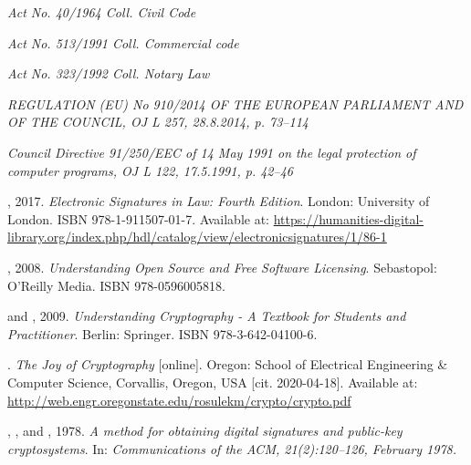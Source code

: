 \documentclass[thesismargins, english, thesislinespacing, onelinechapterstyle, upjsfrontpage]{rnthesis}
\begin{document}
\begin{thebibliography}{9}

  \emph{Act No. 40/1964 Coll. Civil Code}

  \emph{Act No. 513/1991 Coll. Commercial code}

  \emph{Act No. 323/1992 Coll. Notary Law}

  \emph{REGULATION (EU) No 910/2014 OF THE EUROPEAN PARLIAMENT AND OF THE COUNCIL, OJ L 257, 28.8.2014, p. 73–114}

  \emph{Council Directive 91/250/EEC of 14 May 1991 on the legal protection of computer programs, OJ L 122, 17.5.1991, p. 42–46}

  , 2017. \emph{Electronic Signatures in Law: Fourth Edition}. London: University of London. ISBN 978-1-911507-01-7. Available at: \url{https://humanities-digital-library.org/index.php/hdl/catalog/view/electronicsignatures/1/86-1}

  , 2008. \emph{Understanding Open Source and Free Software Licensing}. Sebastopol: O’Reilly Media. ISBN 978-0596005818.

   and , 2009. \emph{Understanding Cryptography - A Textbook for Students and Practitioner}. Berlin: Springer. ISBN 978-3-642-04100-6.

  . \emph{The Joy of Cryptography} [online]. Oregon: School of Electrical Engineering \& Computer Science, Corvallis, Oregon, USA [cit. 2020-04-18]. Available at: \url{http://web.engr.oregonstate.edu/rosulekm/crypto/crypto.pdf}

  , , and , 1978. \emph{A method for obtaining digital signatures and public-key cryptosystems}. In: \emph{Communications of the ACM, 21(2):120–126, February 1978.}


\end{thebibliography}
\end{document}

